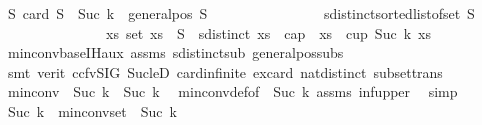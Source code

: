 \begin{isabellebody}
\ {}{\isacharcolon}{\kern0pt}{\isachardoublequoteopen}{\isasymforall}S{\isachardot}{\kern0pt}\ {\isacharparenleft}{\kern0pt}card\ S\ {\isasymge}\ Suc\ k{\isacharparenright}{\kern0pt}\ {\isasymand}\ general{\isacharunderscore}{\kern0pt}pos\ S\ {\isasymand}\ \isanewline
\ \ \ \ \ \ \ \ \ \ \ \ \ \ sdistinct{\isacharparenleft}{\kern0pt}sorted{\isacharunderscore}{\kern0pt}list{\isacharunderscore}{\kern0pt}of{\isacharunderscore}{\kern0pt}set\ S{\isacharparenright}{\kern0pt}\isanewline
\ \ \ \ \ \ \ \ \ \ \ \ \ \ {\isasymlongrightarrow}\ {\isacharparenleft}{\kern0pt}{\isasymexists}xs{\isachardot}{\kern0pt}\ {\isacharparenleft}{\kern0pt}set\ xs\ {\isasymsubseteq}\ S{\isacharparenright}{\kern0pt}\ {\isasymand}\ sdistinct\ xs\ {\isasymand}\ {\isacharparenleft}{\kern0pt}cap\ {}\ xs\ {\isasymor}\ cup\ {\isacharparenleft}{\kern0pt}Suc\ k{\isacharparenright}{\kern0pt}\ xs{\isacharparenright}{\kern0pt}{\isacharparenright}{\kern0pt}{\isachardoublequoteclose}\isanewline
\ \ \isamarkupfalse%
\ min{\isacharunderscore}{\kern0pt}conv{\isacharunderscore}{\kern0pt}base{\isacharunderscore}{\kern0pt}IH{\isacharunderscore}{\kern0pt}aux\ assms\ sdistinct{\isacharunderscore}{\kern0pt}sub\ general{\isacharunderscore}{\kern0pt}pos{\isacharunderscore}{\kern0pt}subs\isanewline
\ \ \isamarkupfalse%
\ {\isacharparenleft}{\kern0pt}smt\ {\isacharparenleft}{\kern0pt}verit{\isacharcomma}{\kern0pt}\ ccfv{\isacharunderscore}{\kern0pt}SIG{\isacharparenright}{\kern0pt}\ Suc{\isacharunderscore}{\kern0pt}le{\isacharunderscore}{\kern0pt}D\ card{\isachardot}{\kern0pt}infinite\ ex{\isacharunderscore}{\kern0pt}card\ nat{\isachardot}{\kern0pt}distinct{\isacharparenleft}{\kern0pt}{}{\isacharparenright}{\kern0pt}\ subset{\isacharunderscore}{\kern0pt}trans{\isacharparenright}{\kern0pt}\isanewline
\ \ \isamarkupfalse%
\ {\isachardoublequoteopen}min{\isacharunderscore}{\kern0pt}conv\ {}\ {\isacharparenleft}{\kern0pt}Suc\ k{\isacharparenright}{\kern0pt}\ {\isasymle}\ Suc\ k{\isachardoublequoteclose}\ \isamarkupfalse%
\ min{\isacharunderscore}{\kern0pt}conv{\isacharunderscore}{\kern0pt}def{\isacharbrackleft}{\kern0pt}of\ {\isachardoublequoteopen}{}{\isachardoublequoteclose}\ {\isachardoublequoteopen}Suc\ k{\isachardoublequoteclose}{\isacharbrackright}{\kern0pt}\ assms\ inf{\isacharunderscore}{\kern0pt}upper\ \isamarkupfalse%
\ simp\isanewline
\ \ \isamarkupfalse%
\ {\isachardoublequoteopen}Suc\ k\ {\isasymin}\ min{\isacharunderscore}{\kern0pt}conv{\isacharunderscore}{\kern0pt}set\ {}\ {\isacharparenleft}{\kern0pt}Suc\ k{\isacharparenright}{\kern0pt}{\isachardoublequoteclose}\ \ \isamarkupfalse%

\end{isabellebody}
